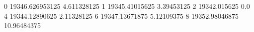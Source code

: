 0 19346.626953125 4.611328125
1 19345.41015625 3.39453125
2 19342.015625 0.0
4 19344.12890625 2.11328125
6 19347.13671875 5.12109375
8 19352.98046875 10.96484375
